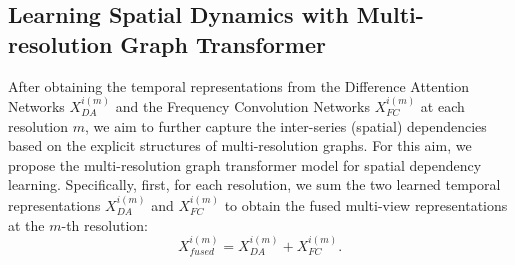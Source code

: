 \subsection{Learning Spatial Dynamics with Multi-resolution Graph Transformer}\label{sec:4}


After obtaining the temporal representations from the Difference Attention Networks ${X}^{i(m)}_{DA}$ and the Frequency Convolution Networks ${X}^{i(m)}_{FC}$ at each resolution $m$, we aim to further capture the inter-series (spatial) dependencies based on the explicit structures of multi-resolution graphs. For this aim, we propose the multi-resolution graph transformer model for spatial dependency learning.
Specifically, first, for each resolution, we sum the two learned temporal representations ${X}^{i(m)}_{DA}$ and ${X}^{i(m)}_{FC}$ to obtain the fused multi-view representations at the $m$-th resolution:
\begin{equation}
{X}^{i(m)}_{fused} = {X}^{i(m)}_{DA} + {X}^{i(m)}_{FC}.
\end{equation}

